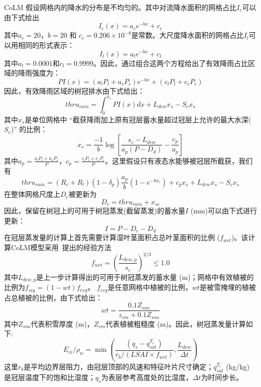 CoLM 假设网格内的降水的分布是不均匀的。其中对流降水面积的网格占比$I_c$可以由下式给出
\begin{equation}
I_{c}(x)=a_{c} e^{-bx}+c_{c}
\end{equation}
其中$a_c=20$，$b=20$ 和 $c_c=0.206\times10^{-8}$是常数。大尺度降水面积的网格占比$I_l$可以用相同的形式表示：
\begin{equation}
I_{l}(x)=a_{l} e^{-b x}+c_{l}
\end{equation}
其中$a_l=0.0001$和$c_l=0.9999$。因此，通过组合这两个方程给出了有效降雨占比区域的降雨强度为：
\begin{equation}
P I(x)=\left(a_{l} P_{l}+a_{c} P_{c}\right) e^{-b x}+\left(c_{l} P_{l}+c_{c} P_{c}\right)
\end{equation}
因此，有效降雨区域的树冠排水由下式给出：
\begin{equation}
thru_{rain}=\int_{0}^{x_{s}} P I(x) d x+L_{dew} x_{s}-S_{c} x_{s}
\end{equation}
其中$x_s$是单位网格中 ``截获降雨加上原有冠层蓄水量超过冠层上允许的最大水深($S_c$)'' 的比例：
\begin{equation}
x_{s}=\frac{-1}{b} \log \left[\frac{s_{c}-L_{d e w}}{a_{p}\left(P-D_{d}\right)}-\frac{c_{p}}{a_{p}}\right]
\end{equation}
其中$a_p=\frac{a_lP_l+a_cP_c}{P}$，$c_p=\frac{c_lP_l+c_cP_c}{P}$。这里假设只有液态水能够被冠层所截获，我们有
\begin{equation}
t h r u_{ {rain }}=\left(R_{c}+R_{l}\right)\left(1-\delta_{p}\right) \frac{a_{p}}{b}\left(1-e^{-b x_{s}}\right)+c_{p} x_{s}+L_{d e w} x_{s}-S_{c} x_{s}
\end{equation}
在整体网格尺度上$D_c$被更新为
\begin{equation}
D_c=thru_{r a i n}+x_{s c}
\end{equation}
因此，保留在树冠上的可用于树冠蒸发(截留蒸发)的蓄水量$I$ (mm)可以由下式进行更新：
\begin{equation}
I={P}-D_{c}-D_{d}
\end{equation}
在冠层蒸发量的计算上首先需要计算湿叶茎面积占总叶茎面积的比例 ($f_{wet}$)。该计算CoLM模型采用~\citet{dickinson1993biosphere}提出的经验方法
\begin{equation}
f_{{wet}}=\left(\frac{L_{dew, p}}{s_{c}}\right)^{2 / 3} \leq 1.0
\end{equation}
其中$L_{dew, p}$是上一步计算得出的可用于树冠蒸发的蓄水量 (m)；网格中有效植被的比例为$f_{sig}=\left(1-wt\right)f_{evg}$。
$f_{evg}$是任意网格中植被的比例，$wt$是被雪掩埋的植被占总植被的比例，由下式给出：
\begin{equation}
w t=\frac{0.1 Z_{sno}}{z_{vm}+0.1 Z_{sno}}
\end{equation}
其中$Z_{sno}$代表积雪厚度 (m)，$Z_{vm}$代表植被粗糙度 (m)。因此，树冠蒸发量计算如下:
\begin{equation}
E_{ci} / \rho_{w}=\min \left(\frac{\left(q_{s}-q_{sat}^{T_{c}}\right)}{r_{b} /\left(LSAI \times f_{wet}\right)}, \frac{L_{dew}}{\Delta t}\right)
\end{equation}
这里$r_b$是平均边界层阻力，由冠层顶部的风速和特征叶片尺寸确定；$q_{sat}^{T_c}$ (kg/kg) 是冠层温度下的饱和比湿度；$q_s$为表层参考高度处的比湿度，$\Delta t$为时间步长。


